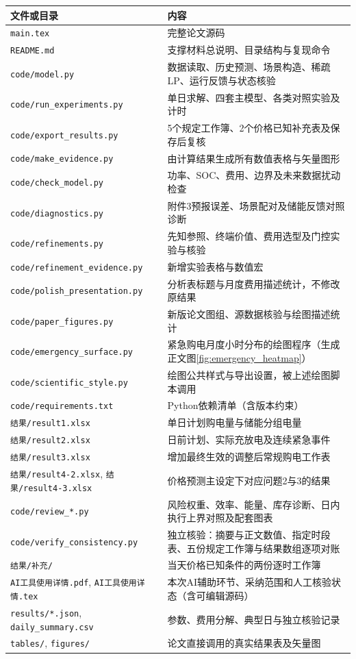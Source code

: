 \documentclass[UTF8,fontset=none,a4paper,zihao=-4]{ctexart}
\begin{document}
\begin{center}\small\begin{tabular}{>{\raggedright\arraybackslash}p{5.5cm}>{\raggedright\arraybackslash}p{8.5cm}}\toprule
文件或目录 & 内容\\\midrule
\texttt{main.tex} & 完整论文源码\\
\texttt{README.md} & 支撑材料总说明、目录结构与复现命令\\
\texttt{code/model.py} & 数据读取、历史预测、场景构造、稀疏LP、运行反馈与状态核验\\
\texttt{code/run\_experiments.py} & 单日求解、四套主模型、各类对照实验及计时\\
\texttt{code/export\_results.py} & 5个规定工作簿、2个价格已知补充表及保存后复核\\
\texttt{code/make\_evidence.py} & 由计算结果生成所有数值表格与矢量图形\\
\texttt{code/check\_model.py} & 功率、SOC、费用、边界及未来数据扰动检查\\
\texttt{code/diagnostics.py} & 附件3预报误差、场景配对及储能反馈对照诊断\\
\texttt{code/refinements.py} & 先知参照、终端价值、费用选型及门控实验与核验\\
\texttt{code/refinement\_evidence.py} & 新增实验表格与数值宏\\
\texttt{code/polish\_presentation.py} & 分析表标题与月度费用描述统计，不修改原结果\\
\texttt{code/paper\_figures.py} & 新版论文图组、源数据核验与绘图描述统计\\
\texttt{code/emergency\_surface.py} & 紧急购电月度小时分布的绘图程序（生成正文图\ref{fig:emergency_heatmap}）\\
\texttt{code/scientific\_style.py} & 绘图公共样式与导出设置，被上述绘图脚本调用\\
\texttt{code/requirements.txt} & Python依赖清单（含版本约束）\\
\texttt{结果/result1.xlsx} & 单日计划购电量与储能分组电量\\
\texttt{结果/result2.xlsx} & 日前计划、实际充放电及连续紧急事件\\
\texttt{结果/result3.xlsx} & 增加最终生效的调整后常规购电工作表\\
\texttt{结果/result4-2.xlsx}, \texttt{结果/result4-3.xlsx} & 价格预测主设定下对应问题2与3的结果\\
\texttt{code/review\_*.py} & 风险权重、效率、能量、库存诊断、日内执行上界对照及配套图表\\
\texttt{code/verify\_consistency.py} & 独立核验：摘要与正文数值、指定时段表、五份规定工作簿与结果数组逐项对账\\
\texttt{结果/补充/} & 当天价格已知条件的两份逐时工作簿\\
\texttt{AI工具使用详情.pdf}, \texttt{AI工具使用详情.tex} & 本次AI辅助环节、采纳范围和人工核验状态（含可编辑源码）\\
\texttt{results/*.json}, \texttt{daily\_summary.csv} & 参数、费用分解、典型日与独立核验记录\\
\texttt{tables/}, \texttt{figures/} & 论文直接调用的真实结果表及矢量图\\\bottomrule
\end{tabular}\end{center}
\end{document}
